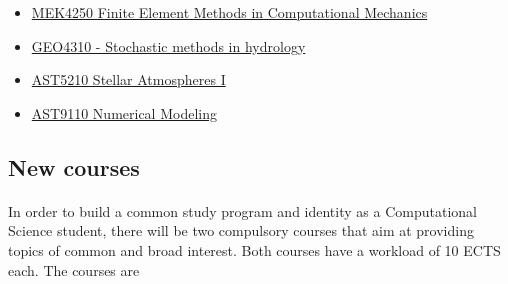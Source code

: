 \documentclass[%
oneside,                 %
final,                   %
10pt]{article}
\begin{document}
\begin{itemize}
\item \href{{http://www.uio.no/studier/emner/matnat/math/MEK4250/index-eng.html}}{MEK4250 Finite Element Methods in Computational Mechanics}

\item \href{{http://www.uio.no/studier/emner/matnat/geofag/GEO4310/}}{GEO4310 - Stochastic methods in hydrology}

\item \href{{http://www.uio.no/studier/emner/matnat/astro/AST5210/index-eng.html}}{AST5210 Stellar Atmospheres I}

\item \href{{http://www.uio.no/studier/emner/matnat/astro/AST9110/index-eng.html}}{AST9110 Numerical Modeling}
\end{itemize}

\noindent



\subsection*{New courses}

\paragraph{}
In order to build a common study program and identity as a Computational Science student, there will be two compulsory courses that aim at providing topics of common and broad interest.
Both courses have a workload of 10 ECTS each. The courses are
\end{document}
